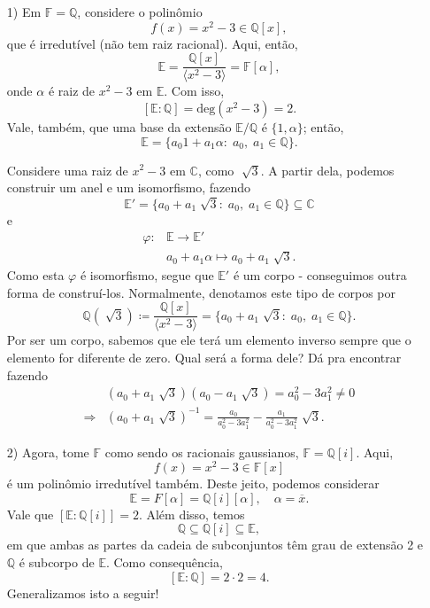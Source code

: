 \documentclass[../algebraIII_notes.tex]{subfiles}
\begin{document}
\begin{example}
	\begin{itemize}
		\item[1)] Em \(\mathbb{F} = \mathbb{Q}\), considere o polinômio
		      \[
			      f(x) = x^{2} - 3\in \mathbb{Q}[x],
		      \]
		      que é irredutível (não tem raiz racional). Aqui, então,
		      \[
			      \mathbb{E}=\frac{\mathbb{Q}[x]}{\langle x^{2}-3 \rangle} = \mathbb{F}[\alpha ],
		      \]
		      onde \(\alpha \) é raiz de \(x^{2}-3\) em \(\mathbb{E}\). Com isso,
		      \[
			      [\mathbb{E}:\mathbb{Q}] = \mathrm{deg}(x^{2}-3) = 2.
		      \]
		      Vale, também, que uma base da extensão \(\mathbb{E}/\mathbb{Q}\) é \(\{1, \alpha \}\); então,
		      \[
			      \mathbb{E} = \{a_{0}1 + a_{1}\alpha : \; a_{0}, \; a_{1}\in \mathbb{Q}\}.
		      \]

		      Considere uma raiz de \(x^{2}-3\) em \(\mathbb{C}\), como \(\sqrt[]{3}\). A partir dela, podemos construir um anel e um isomorfismo, fazendo
		      \[
			      \mathbb{E}' = \{a_{0} + a_{1}\sqrt[]{3}:\; a_{0}, \; a_{1}\in \mathbb{Q}\}\subseteq \mathbb{C}
		      \]
		      e
		      \begin{align*}
			      \varphi: & \mathbb{E}\rightarrow \mathbb{E}'                    \\
			               & a_{0} + a_{1}\alpha \mapsto a_{0} + a_{1}\sqrt[]{3}.
		      \end{align*}
		      Como esta \(\varphi \) é isomorfismo, segue que \(\mathbb{E}'\) é um corpo - conseguimos outra forma de construí-los. Normalmente, denotamos este tipo de corpos por
		      \[
			      \mathbb{Q}(\sqrt[]{3})\coloneqq \frac{\mathbb{Q}[x]}{\langle x^{2}-3 \rangle} = \{a_{0} + a_{1}\sqrt[]{3}:\; a_{0}, \; a_{1}\in \mathbb{Q}\}.
		      \]
		      Por ser um corpo, sabemos que ele terá um elemento inverso sempre que o elemento for diferente de zero. Qual será a forma dele? Dá pra encontrar fazendo
		      \begin{align*}
			                  & (a_{0} + a_{1}\sqrt[]{3})(a_{0} - a_1\sqrt[]{3}) = a_{0}^{2} - 3 a_{1}^{2}\neq 0                                          \\
			      \Rightarrow & (a_{0} + a_{1}\sqrt[]{3})^{-1} = \frac{a_{0}}{a_{0}^{2} - 3 a_{1}^{2}} - \frac{a_{1}}{a_{0}^{2} - 3 a_{1}^{2}}\sqrt[]{3}.
		      \end{align*}
		\item[2)] Agora, tome \(\mathbb{F}\) como sendo os racionais gaussianos, \(\mathbb{F} = \mathbb{Q}[i]\). Aqui,
		      \[
			      f(x) = x^{2}-3\in \mathbb{F}[x]
		      \]
		      é um polinômio irredutível também. Deste jeito, podemos considerar
		      \[
			      \mathbb{E} = F[\alpha ] = \mathbb{Q}[i][\alpha ], \quad \alpha =\overline{x}.
		      \]
		      Vale que \([\mathbb{E}:\mathbb{Q}[i]] = 2\). Além disso, temos
		      \[
			      \mathbb{Q}\subseteq \mathbb{Q}[i]\subseteq \mathbb{E},
		      \]
		      em que ambas as partes da cadeia de subconjuntos têm grau de extensão 2 e \(\mathbb{Q}\) é subcorpo de \(\mathbb{E}\). Como consequência,
		      \[
			      [\mathbb{E}:\mathbb{Q}] = 2 \cdot 2 = 4.
		      \]
		      Generalizamos isto a seguir!
	\end{itemize}
\end{example}
\end{document}
